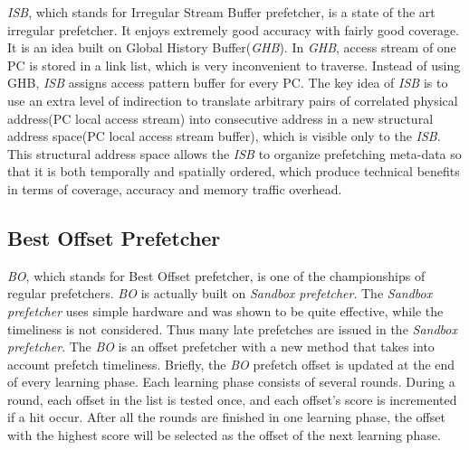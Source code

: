   \emph{ISB}, which stands for Irregular Stream Buffer prefetcher, is a state of the art irregular prefetcher. It enjoys extremely good accuracy with fairly good coverage. It is an idea built on Global History Buffer(\emph{GHB})\cite{ghbpaper}.
In \emph{GHB}, access stream of one PC is stored in a link list, which is very inconvenient to traverse. Instead of using GHB, \emph{ISB} assigns access pattern buffer for every PC.
The key idea of \emph{ISB} is to use an extra level of indirection to translate arbitrary pairs of correlated physical address(PC local access stream) into consecutive address in a new structural address space(PC local access stream buffer), which is visible only to the \emph{ISB}. 
This structural address space allows the \emph{ISB} to organize prefetching meta-data so that it is both temporally and spatially ordered, which produce technical benefits in terms of coverage, accuracy and memory traffic overhead.

  \subsection{Best Offset Prefetcher}
  \label{sec:bointro}

  \emph{BO}, which stands for Best Offset prefetcher, is one of the championships of regular prefetchers. \emph{BO} is actually built on \emph{Sandbox prefetcher}\cite{sandboxpaper}. 
 The \emph{Sandbox prefetcher} uses simple hardware and was shown to be quite effective, while the timeliness is not considered. 
 Thus many late prefetches are issued in the \emph{Sandbox prefetcher}. 
 The \emph{BO} is an offset prefetcher with a new method that takes into account prefetch timeliness. Briefly, the \emph{BO} prefetch offset is updated at the end of every learning phase. Each learning phase consists of several rounds. 
 During a round, each offset in the list is tested once, and each offset's score is incremented if a hit occur. 
 After all the rounds are finished in one learning phase, the offset with the highest score will be selected as the offset of the next learning phase.

